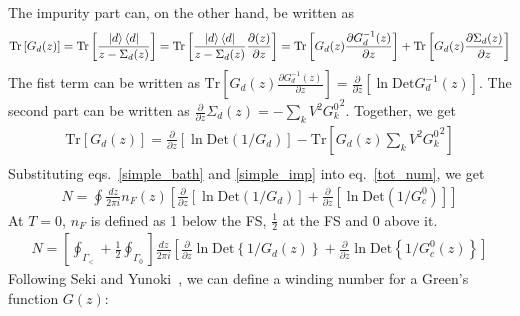 The impurity part can, on the other hand, be written as
\begin{equation}\begin{aligned}
	\label{self_id}
	\text{Tr}\left[G_{d}(z)\right] &= \text{Tr}\left[ \frac{\ket{d}\bra{d}}{z - \Sigma_d(z)}\right] = \text{Tr}\left[ \frac{\ket{d}\bra{d}}{z - \Sigma_d(z)}\frac{\partial{\left(z\right)}}{\partial{z}} \right] = \text{Tr}\left[ G_{d}(z)\frac{\partial{G_{d}^{-1}(z)}}{\partial{z}} \right] + \text{Tr}\left[ G_{d}(z)\frac{\partial{\Sigma_d(z)}}{\partial{z}} \right]\\
\end{aligned}\end{equation}
The fist term can be written as \(\text{Tr}\left[ G_{d}(z)\frac{\partial{G_{d}^{-1}(z)}}{\partial{z}} \right] = \frac{\partial{}}{\partial{z}}\left[\ln \text{Det}G_{d}^{-1}(z)\right]\). The second part can be written as \(\frac{\partial{}}{\partial{z}}{\Sigma_d(z)} = -\sum_k V^2 {G_k^0}^2\). Together, we get
\begin{equation}\begin{aligned}
	\label{simple_imp}
	\text{Tr}\left[G_{d}(z)\right] = \frac{\partial{}}{\partial{z}}\left[\ln \text{Det}\left(1/G_{d}\right)\right] - \text{Tr}\left[ G_{d}(z)\sum_k V^2 {G_k^0}^2\right]\\
\end{aligned}\end{equation}
Substituting eqs.~\ref{simple_bath} and \ref{simple_imp} into eq.~\ref{tot_num}, we get
\begin{equation}\begin{aligned}
	N = \oint \frac{dz}{2\pi i}n_F(z) \left[\frac{\partial{}}{\partial{z}}\left[\ln \text{Det}\left(1/G_{d}\right)\right] + \frac{\partial{}}{\partial{z}}\left[\ln \text{Det}\left(1/G_{c}^{0}\right)\right]\right]
\end{aligned}\end{equation}
At \(T=0\), \(n_F\) is defined as 1 below the FS, \(\frac{1}{2}\) at the FS and 0 above it.
\begin{equation}\begin{aligned}
N  = \left[\oint_{\Gamma_<} + \frac{1}{2}\oint_{\Gamma_0}\right]\frac{dz}{2\pi i}\left[\frac{\partial{}}{\partial{z}} \ln \text{Det} \left\{1/G_d(z)\right\} + \frac{\partial{}}{\partial{z}} \ln \text{Det} \left\{1/G_{c}^{0}(z)\right\} \right]
\end{aligned}\end{equation}
Following Seki and Yunoki~\cite{seki2017topological}, we can define a winding number for a Green's function \(G(z)\):
